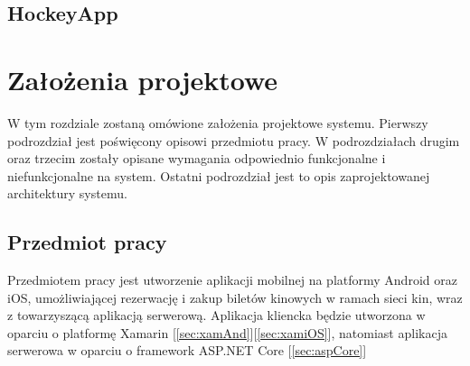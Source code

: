 \section{HockeyApp}
\label{sec:hockeyapp}

\chapter{Założenia projektowe}
W tym rozdziale zostaną omówione założenia projektowe systemu. Pierwszy podrozdział jest poświęcony opisowi przedmiotu pracy. W podrozdziałach drugim oraz trzecim zostały opisane wymagania odpowiednio funkcjonalne i niefunkcjonalne na system. Ostatni podrozdział jest to opis zaprojektowanej architektury systemu.
\section{Przedmiot pracy}
Przedmiotem pracy jest utworzenie aplikacji mobilnej na platformy Android oraz iOS, umożliwiającej rezerwację i zakup biletów kinowych w ramach sieci kin, wraz z towarzyszącą aplikacją serwerową. Aplikacja kliencka będzie utworzona w oparciu o platformę Xamarin [\ref{sec:xamAnd}][\ref{sec:xamiOS}], natomiast aplikacja serwerowa w oparciu o framework ASP.NET Core [\ref{sec:aspCore}]
